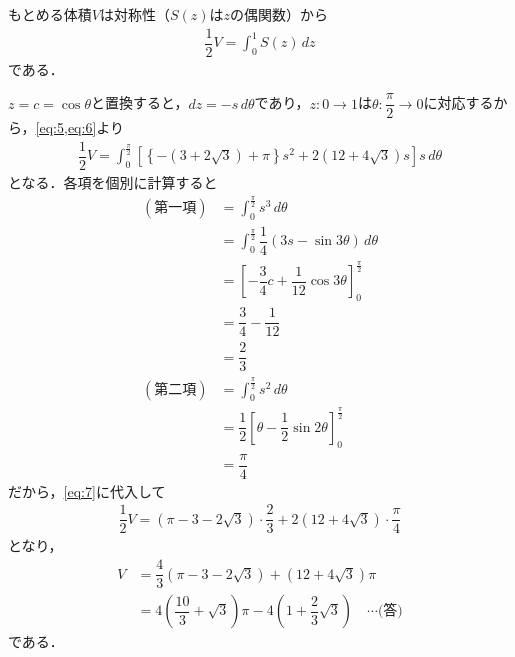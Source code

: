 \documentclass[../../main.tex]{subfiles}
\begin{document}
もとめる体積$V$は対称性（$S(z)$は$z$の偶関数）から
\begin{align}
  \dfrac{1}{2}V = \int_0^1 S(z)\,dz \label{eq:6}
\end{align}
である．

$z=c=\cos\theta$と置換すると，$dz=-s\,d\theta$であり，$z:0\to1$は$\theta:\dfrac{\pi}{2}\to0$に対応するから，\cref{eq:5,eq:6}より
\begin{align}
  \dfrac{1}{2}V = \int_0^{\frac{\pi}{2}} \left[\left\{-(3+2\sqrt{3})+\pi\right\}s^2+2(12+4\sqrt{3})s \right]s\,d\theta \label{eq:7}
\end{align}
となる．各項を個別に計算すると
\begin{align}
  (\text{第一項})
  &= \int_0^{\frac{\pi}{2}} s^3\,d\theta \\
  &= \int_0^{\frac{\pi}{2}} \dfrac{1}{4}(3s-\sin3\theta)\,d\theta \\
  &= \left[-\dfrac{3}{4}c+\dfrac{1}{12}\cos3\theta\right]_0^{\frac{\pi}{2}} \\
  &= \dfrac{3}{4}-\dfrac{1}{12} \\
  &= \dfrac{2}{3} \\
  (\text{第二項})
  &= \int_0^{\frac{\pi}{2}} s^2\,d\theta \\
  &= \dfrac{1}{2}\left[\theta-\dfrac{1}{2}\sin2\theta\right]_0^{\frac{\pi}{2}} \\
  &= \dfrac{\pi}{4}
\end{align}
だから，\cref{eq:7}に代入して
\begin{align}
  \dfrac{1}{2}V
  = (\pi-3-2\sqrt{3})\cdot\dfrac{2}{3} + 2(12+4\sqrt{3})\cdot\dfrac{\pi}{4}
\end{align}
となり，
\begin{align}
  V
  &= \dfrac{4}{3}(\pi-3-2\sqrt{3}) + (12+4\sqrt{3})\pi \\
  &= 4\left(\dfrac{10}{3}+\sqrt{3}\right)\pi - 4\left(1+\dfrac{2}{3}\sqrt{3}\right) \quad \cdots\text{(答)}
\end{align}
である．

\newpage
\end{document}
